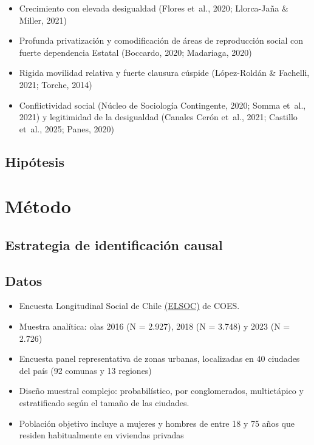 \documentclass[
  spanish,
  letterpaper,
  DIV=11,
  numbers=noendperiod,
  oneside]{scrartcl}
\providecommand{\tightlist}{%
  \setlength{\itemsep}{0pt}\setlength{\parskip}{0pt}}
\begin{document}
\begin{itemize}
\tightlist
\item
  Crecimiento con elevada desigualdad (Flores et~al., 2020; Llorca-Jaña
  \& Miller, 2021)
\item
  Profunda privatización y comodificación de áreas de reproducción
  social con fuerte dependencia Estatal (Boccardo, 2020; Madariaga,
  2020)
\item
  Rigida movilidad relativa y fuerte clausura cúspide (López-Roldán \&
  Fachelli, 2021; Torche, 2014)
\item
  Conflictividad social (Núcleo de Sociología Contingente, 2020; Somma
  et~al., 2021) y legitimidad de la desigualdad (Canales Cerón et~al.,
  2021; Castillo et~al., 2025; Panes, 2020)
\end{itemize}

\subsection{Hipótesis}\label{hipuxf3tesis}

\section{Método}\label{muxe9todo}

\subsection{Estrategia de identificación
causal}\label{estrategia-de-identificaciuxf3n-causal}

\subsection{Datos}\label{datos}

\begin{itemize}
\item
  Encuesta Longitudinal Social de Chile
  \href{https://coes.cl/elsoc/}{(ELSOC)} de COES.
\item
  Muestra analítica: olas 2016 (N = 2.927), 2018 (N = 3.748) y 2023 (N =
  2.726)
\item
  Encuesta panel representativa de zonas urbanas, localizadas en 40
  ciudades del país (92 comunas y 13 regiones)
\item
  Diseño muestral complejo: probabilístico, por conglomerados,
  multietápico y estratificado según el tamaño de las ciudades.
\item
  Población objetivo incluye a mujeres y hombres de entre 18 y 75 años
  que residen habitualmente en viviendas privadas
\end{itemize}
\end{document}
